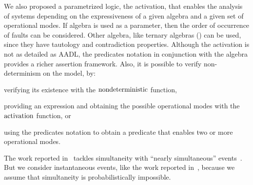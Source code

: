 We also proposed a parametrized logic, the \ac{activation}, that enables the analysis of systems depending on the expressiveness of a given algebra and a given set of operational modes.
If \ac{algebra} is used as a parameter, then the order of occurrence of faults can be considered.
Other algebra, like ternary algebras (\cite{Jones2016}) can be used, since they have tautology and contradiction properties.
Although the \ac{activation} is not as detailed as \ac{AADL}, the predicates notation in conjunction with the \ac{algebra} provides a richer assertion framework.
Also, it is possible to verify non-determinism on the model, by: 
\begin{alineasinline}
  \item verifying its existence with the $\mathrm{nondeterministic}$ function, 
  \item providing an expression and obtaining the possible operational modes with the $\mathrm{activation}$ function, or 
  \item using the predicates notation to obtain a predicate that enables two or more operational modes.
\end{alineasinline}



%
%

\begin{sloppypar}
	The work reported in~\cite{Walker2009,WP2009,WP2010} tackles simultaneity with ``nearly simultaneous'' events~\cite{EWG2013}.
	But we consider instantaneous events, like the work reported in~\cite{MRL2014}, because we assume that simultaneity is probabilistically impossible.
\end{sloppypar}

